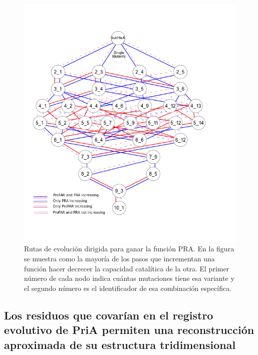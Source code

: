 \documentclass[12pt,twoside]{reedthesis}
\begin{document}
  \begin{figure}[h!tbp]
  \centering
  \includegraphics[angle = 0,scale = 0.7]{chapter4/LianetFiguras/SolocirculosPRA_PRO_RUTAS_10_1_r002.png}
  \caption[Positive increments on PRA]{\footnotesize{Rutas de evolución dirigida para ganar la función PRA. En la figura se muestra como la mayoría de los pasos que incrementan una función hacer decrecer la capacidad catalítica de la otra. El primer número de cada nodo indica cuántas mutaciones tiene esa variante y el segundo número es el identificador de esa combinación específica.}}
  \label{fig:PRARutas}
  \end{figure}
  
  \clearpage  
  
  \subsection{Los residuos que covarían en el registro evolutivo de PriA
  permiten una reconstrucción aproximada de su estructura
  tridimensional}\label{los-residuos-que-covarian-en-el-registro-evolutivo-de-pria-permiten-una-reconstruccion-aproximada-de-su-estructura-tridimensional}
  
\end{document}
